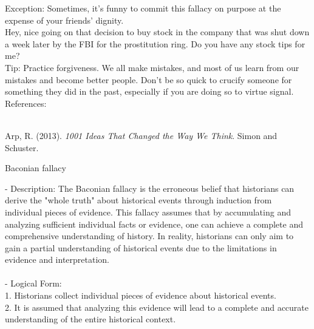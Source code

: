 \documentclass[a4paper,12pt,single,pdftex]{scrbook}
\begin{document}
{    
      Exception: Sometimes, it’s funny to commit this fallacy on purpose at the expense of your friends’ dignity.
    \\

    
      Hey, nice going on that decision to buy stock in the company that was shut down a week later by the FBI for the prostitution ring.  Do you have any stock tips for me?
    \\

    
      Tip: Practice forgiveness. We all make mistakes, and most of us learn from our mistakes and become better people. Don’t be so quick to crucify someone for something they did in the past, especially if you are doing so to virtue signal.
    \\

    References:

    
      
        
      \\

      
        
          Arp, R. (2013). {\it 1001 Ideas That Changed the Way We Think}. Simon and Schuster.
        
      
    
  }


Baconian fallacy
    
      - Description: The Baconian fallacy is the erroneous belief that historians can derive the "whole truth" about historical events through induction from individual pieces of evidence. This fallacy assumes that by accumulating and analyzing sufficient individual facts or evidence, one can achieve a complete and comprehensive understanding of history. In reality, historians can only aim to gain a partial understanding of historical events due to the limitations in evidence and interpretation.
    \\

    
      
    \\

    
      - Logical Form:
    \\

    
        1. Historians collect individual pieces of evidence about historical events.
    \\

    
        2. It is assumed that analyzing this evidence will lead to a complete and accurate understanding of the entire historical context.
    \\
\end{document}
